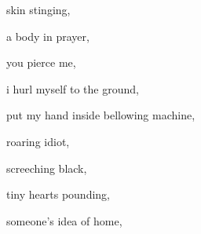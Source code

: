 \documentclass[extrafontsizes, 48pt]{memoir}
\begin{document}
	\begin{minipage}{.6\textwidth}
	skin stinging,
	\end{minipage}
	\newpage

	\begin{minipage}{.6\textwidth}
	a body in prayer,
	\end{minipage}
	\newpage

	\begin{minipage}{.6\textwidth}
	you pierce me,
	\end{minipage}
	\newpage

	\begin{minipage}{.6\textwidth}
	i hurl myself to the ground,
	\end{minipage}
	\newpage

	\begin{minipage}{.6\textwidth}
	put my hand inside bellowing machine,
	\end{minipage}
	\newpage

	\begin{minipage}{.6\textwidth}
	roaring idiot,
	\end{minipage}
	\newpage

	\begin{minipage}{.6\textwidth}
	screeching black,
	\end{minipage}
	\newpage

	\begin{minipage}{.6\textwidth}
	tiny hearts pounding,
	\end{minipage}
	\newpage

	\begin{minipage}{.6\textwidth}
	someone's idea of home,
	\end{minipage}
	\newpage
\end{document}

